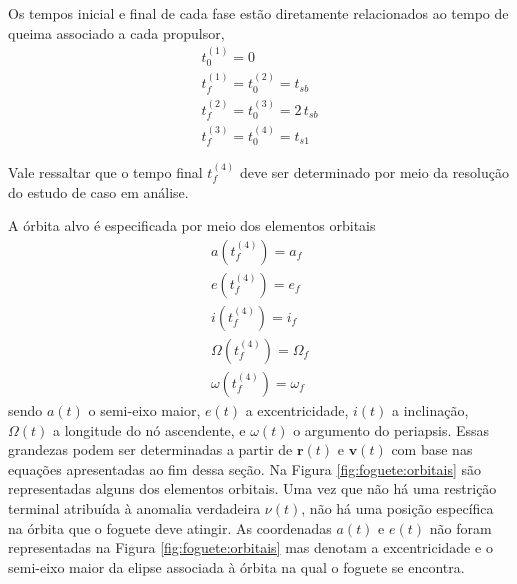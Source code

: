 Os tempos inicial e final de cada fase estão diretamente relacionados ao tempo de queima associado a cada propulsor, 
%
\begin{equation}
	\begin{gathered}
		t_0^{(1)} = 0 \\
		t_f^{(1)} = t_0^{(2)} = t_{sb} \\
		t_f^{(2)} = t_0^{(3)} = 2 \, t_{sb} \\
		t_f^{(3)} = t_0^{(4)} = t_{s1} 
	\end{gathered}
\end{equation}

Vale ressaltar que o tempo final $ t_f^{(4)} $ deve ser determinado por meio da resolução do estudo de caso em análise.


A órbita alvo é especificada por meio dos elementos orbitais
%
\begin{equation}
	\label{eq:foguete:orbitaTerminal}
	\begin{gathered}
		a(t_f^{(4)}) = a_f \\
		e(t_f^{(4)}) = e_f \\
		i(t_f^{(4)}) = i_f \\
		\Omega(t_f^{(4)}) = \Omega_f \\
		\omega(t_f^{(4)}) = \omega_f 
	\end{gathered}
\end{equation}
%
sendo $ a(t) $ o semi-eixo maior, $ e(t) $ a excentricidade, $ i(t) $ a inclinação, $ \Omega(t) $ a longitude do nó ascendente, e $ \omega(t) $ o argumento do periapsis. Essas grandezas podem ser determinadas a partir de $ \mathbf{r}(t) $ e $ \mathbf{v}(t) $ com base nas equações apresentadas ao fim dessa seção. Na Figura \ref{fig:foguete:orbitais} são representadas alguns dos elementos orbitais. Uma vez que não há uma restrição terminal atribuída à anomalia verdadeira $ \nu(t) $, não há uma posição específica na órbita que o foguete deve atingir. As coordenadas $ a(t) $ e $ e(t) $ não foram representadas na Figura \ref{fig:foguete:orbitais} mas denotam a excentricidade e o semi-eixo maior da elipse associada à órbita na qual o foguete se encontra. 

